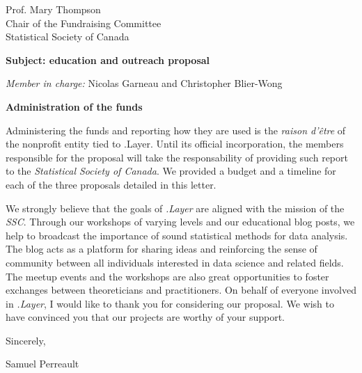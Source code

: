 \documentclass[11pt, a4paper]{letter} %
\begin{document}
\begin{letter}{
	Prof. Mary Thompson\\
	Chair of the Fundraising Committee\\
	Statistical Society of Canada
	
	\bigskip
	\textbf{Subject: education and outreach proposal}%
}
\begin{enumerate}
			
	\bigskip
	\emph{Member in charge:} Nicolas Garneau and Christopher Blier-Wong\\
	
\end{enumerate}


\bigskip
\noindent \textbf{Administration of the funds}

Administering the funds and reporting how they are used is the \emph{raison d'\^{e}tre} of the nonprofit entity tied to .Layer. Until its official incorporation, the members responsible for the proposal will take the responsability of providing such report to the \emph{Statistical Society of Canada}. We provided a budget and a timeline for each of the three proposals detailed in this letter.

\bigskip

We strongly believe that the goals of \emph{.Layer} are aligned with the mission of the \emph{SSC}. Through our workshops of varying levels and our educational blog posts, we help to broadcast the importance of sound statistical methods for data analysis. The blog acts as a platform for sharing ideas and reinforcing the sense of community between all individuals interested in data science and related fields. The meetup events and the workshops are also great opportunities to foster exchanges between theoreticians and practitioners. On behalf of everyone involved in \emph{.Layer}, I would like to thank you for considering our proposal. We wish to have convinced you that our projects are worthy of your support.

\closing{Sincerely,}

\noindent Samuel Perreault




\end{letter}
\end{document}
